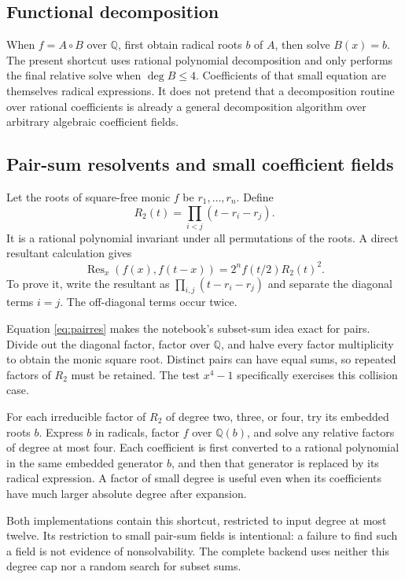 \documentclass[11pt,letterpaper]{article}
\theoremstyle{definition}\newtheorem{definition}[theorem]{Definition}
\theoremstyle{remark}\newtheorem{remark}[theorem]{Remark}
\newcommand{\Q}{\mathbb Q}
\newcommand{\Res}{\operatorname{Res}}
\begin{document}
\subsection{Functional decomposition}
When $f=A\circ B$ over $\Q$, first obtain radical roots $b$ of $A$, then
solve $B(x)=b$. The present shortcut uses rational polynomial decomposition
and only performs the final relative solve when $\deg B\leq4$. Coefficients
of that small equation are themselves radical expressions. It does not
pretend that a decomposition routine over rational coefficients is already
a general decomposition algorithm over arbitrary algebraic coefficient
fields.

\subsection{Pair-sum resolvents and small coefficient fields}
\label{sec:pairs}
Let the roots of square-free monic $f$ be $r_1,\ldots,r_n$. Define
\[
 R_2(t)=\prod_{i<j}(t-r_i-r_j).
\]
It is a rational polynomial invariant under all permutations of the roots.
A direct resultant calculation gives
\begin{equation}\label{eq:pairres}
 \Res_x(f(x),f(t-x))=2^nf(t/2)R_2(t)^2.
\end{equation}
To prove it, write the resultant as
$\prod_{i,j}(t-r_i-r_j)$ and separate the diagonal terms $i=j$.
The off-diagonal terms occur twice.

Equation \eqref{eq:pairres} makes the notebook's subset-sum idea exact for
pairs. Divide out the diagonal factor, factor over $\Q$, and halve every
factor multiplicity to obtain the monic square root. Distinct pairs can
have equal sums, so repeated factors of $R_2$ must be retained. The test
$x^4-1$ specifically exercises this collision case.

For each irreducible factor of $R_2$ of degree two, three, or four, try its
embedded roots $b$. Express $b$ in radicals, factor $f$ over $\Q(b)$, and
solve any relative factors of degree at most four. Each coefficient is
first converted to a rational polynomial in the same embedded generator
$b$, and then that generator is replaced by its radical expression.
A factor of small degree is useful even when its coefficients have much
larger absolute degree after expansion.

Both implementations contain this shortcut, restricted to input degree at
most twelve. Its restriction to small pair-sum fields is intentional: a
failure to find such a field is not evidence of nonsolvability. The complete
backend uses neither this degree cap nor a random search for subset sums.
\end{document}
